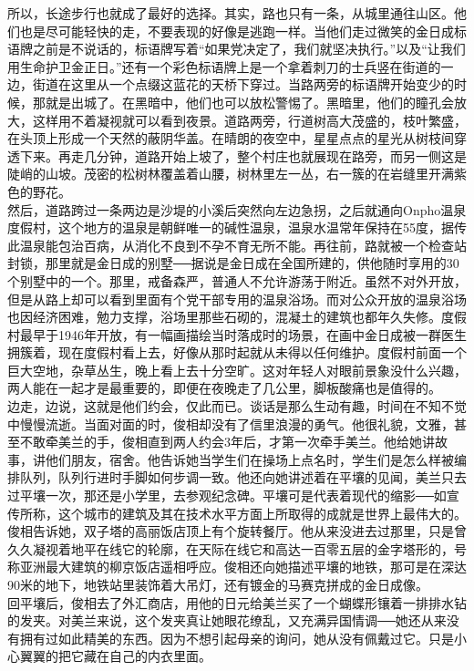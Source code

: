 所以，长途步行也就成了最好的选择。其实，路也只有一条，从城里通往山区。他们也是尽可能轻快的走，不要表现的好像是逃跑一样。当他们走过微笑的金日成标语牌之前是不说话的，标语牌写着“如果党决定了，我们就坚决执行。”以及“让我们用生命护卫金正日。”还有一个彩色标语牌上是一个拿着刺刀的士兵竖在街道的一边，街道在这里从一个点缀这蓝花的天桥下穿过。当路两旁的标语牌开始变少的时候，那就是出城了。在黑暗中，他们也可以放松警惕了。黑暗里，他们的瞳孔会放大，这样用不着凝视就可以看到夜景。道路两旁，行道树高大茂盛的，枝叶繁盛，在头顶上形成一个天然的蔽阴华盖。在晴朗的夜空中，星星点点的星光从树枝间穿透下来。再走几分钟，道路开始上坡了，整个村庄也就展现在路旁，而另一侧这是陡峭的山坡。茂密的松树林覆盖着山腰，树林里左一丛，右一簇的在岩缝里开满紫色的野花。\\

然后，道路跨过一条两边是沙堤的小溪后突然向左边急拐，之后就通向Onpho温泉度假村，这个地方的温泉是朝鲜唯一的碱性温泉，温泉水温常年保持在55度，据传此温泉能包治百病，从消化不良到不孕不育无所不能。再往前，路就被一个检查站封锁，那里就是金日成的别墅──据说是金日成在全国所建的，供他随时享用的30个别墅中的一个。那里，戒备森严，普通人不允许游荡于附近。虽然不对外开放，但是从路上却可以看到里面有个党干部专用的温泉浴场。而对公众开放的温泉浴场也因经济困难，勉力支撑，浴场里那些石砌的，混凝土的建筑也都年久失修。度假村最早于1946年开放，有一幅画描绘当时落成时的场景，在画中金日成被一群医生拥簇着，现在度假村看上去，好像从那时起就从未得以任何维护。度假村前面一个巨大空地，杂草丛生，晚上看上去十分空旷。这对年轻人对眼前景象没什么兴趣，两人能在一起才是最重要的，即便在夜晚走了几公里，脚板酸痛也是值得的。\\

边走，边说，这就是他们约会，仅此而已。谈话是那么生动有趣，时间在不知不觉中慢慢流逝。当面对面的时，俊相却没有了信里浪漫的勇气。他很礼貌，文雅，甚至不敢牵美兰的手，俊相直到两人约会3年后，才第一次牵手美兰。他给她讲故事，讲他们朋友，宿舍。他告诉她当学生们在操场上点名时，学生们是怎么样被编排队列，队列行进时手脚如何步调一致。他还向她讲述着在平壤的见闻，美兰只去过平壤一次，那还是小学里，去参观纪念碑。平壤可是代表着现代的缩影──如宣传所称，这个城市的建筑及其在技术水平方面上所取得的成就是世界上最伟大的。俊相告诉她，双子塔的高丽饭店顶上有个旋转餐厅。他从来没进去过那里，只是曾久久凝视着地平在线它的轮廓，在天际在线它和高达一百零五层的金字塔形的，号称亚洲最大建筑的柳京饭店遥相呼应。俊相还向她描述平壤的地铁，那可是在深达90米的地下，地铁站里装饰着大吊灯，还有镀金的马赛克拼成的金日成像。\\

回平壤后，俊相去了外汇商店，用他的日元给美兰买了一个蝴蝶形镶着一排排水钻的发夹。对美兰来说，这个发夹真让她眼花缭乱，又充满异国情调──她还从来没有拥有过如此精美的东西。因为不想引起母亲的询问，她从没有佩戴过它。只是小心翼翼的把它藏在自己的内衣里面。\\

